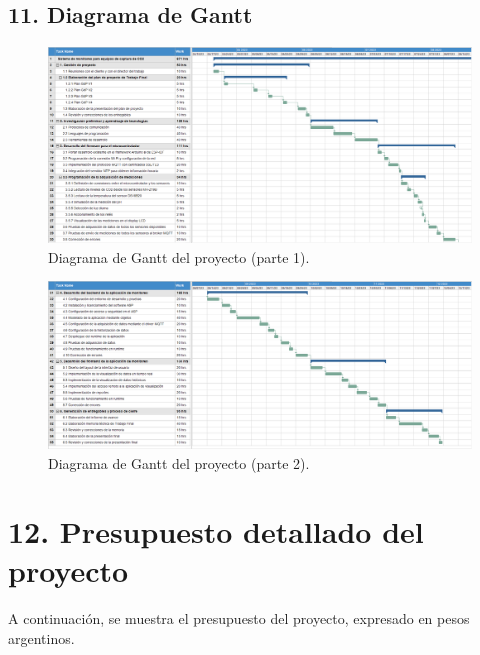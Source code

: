\documentclass[
11pt, %
]{charter}
\begin{document}
\pagebreak
\begin{landscape}
\section{11. Diagrama de Gantt}
\label{sec:gantt}

\begin{figure}[htpb]
\centering 
\includegraphics[height=.70\textheight]{./Figuras/Gantt01.png}
\caption{Diagrama de Gantt del proyecto (parte 1).}
\label{fig:diagGantt01}
\end{figure}
\end{landscape}

\begin{landscape}
\begin{figure}[htpb]
\centering 
\includegraphics[height=.60\textheight]{./Figuras/Gantt02.png}
\caption{Diagrama de Gantt del proyecto (parte 2).}
\label{fig:diagGantt02}
\end{figure}
\end{landscape}

\section{12. Presupuesto detallado del proyecto}
\label{sec:presupuesto}

A continuación, se muestra el presupuesto del proyecto, expresado en pesos argentinos.
\end{document}
